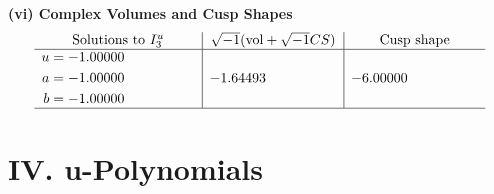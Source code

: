 \documentclass[1p]{elsarticle_modified}
\theoremstyle{definition}
\newcommand{\I}{\sqrt{-1}}
\begin{document}
\newpage\flushleft \textbf{(vi) Complex Volumes and Cusp Shapes}
$$\begin{array}{c|c|c}  
\text{Solutions to }I^u_{3}& \I (\text{vol} + \sqrt{-1}CS) & \text{Cusp shape}\\
 \hline 
\begin{aligned}
u &= -1.00000\phantom{ +0.000000I} \\
a &= -1.00000\phantom{ +0.000000I} \\
b &= -1.00000\phantom{ +0.000000I}\end{aligned}
 & -1.64493\phantom{ +0.000000I} & -6.00000\phantom{ +0.000000I}\\
 \hline 
 \end{array}$$\newpage
\newpage\renewcommand{\arraystretch}{1}
\centering \section*{ IV. u-Polynomials}
\end{document}
